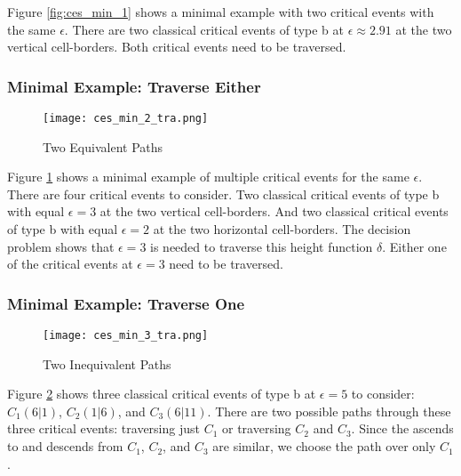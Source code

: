 Figure \ref{fig:ces_min_1} shows a minimal example with two critical events with the same $\epsilon$. There are two classical critical events of type b at $\epsilon \approx 2.91$ at the two vertical cell-borders. Both critical events need to be traversed.


\subsubsection{Minimal Example: Traverse Either}

\begin{figure}[H]
    \centering
    
    \texttt{[image: ces\_min\_2\_tra.png]}
		
	\caption{Two Equivalent Paths\protect\footnotemark}
    \label{fig:ces_min_2}
\end{figure}

Figure \ref{fig:ces_min_2} shows a minimal example of multiple critical events for the same $\epsilon$. There are four critical events to consider. Two classical critical events of type b with equal $\epsilon = 3$ at the two vertical cell-borders. And two classical critical events of type b with equal $\epsilon = 2$ at the two horizontal cell-borders. The decision problem shows that $\epsilon = 3$ is needed to traverse this height function $\delta$. Either one of the critical events at $\epsilon = 3$ need to be traversed.



\subsubsection{Minimal Example: Traverse One}

\begin{figure}[H]
    \centering
    
    \texttt{[image: ces\_min\_3\_tra.png]}
		
	\caption{Two Inequivalent Paths\protect\footnotemark}
    \label{fig:ces_min_3}
\end{figure}

Figure \ref{fig:ces_min_3} shows three classical critical events of type b at $\epsilon = 5$ to consider: $C_1(6|1)$, $C_2(1|6)$, and $C_3(6|11)$. There are two possible paths through these three critical events: traversing just $C_1$ or traversing $C_2$ and $C_3$. Since the ascends to and descends from $C_1$, $C_2$, and $C_3$ are similar, we choose the path over only $C_1$.



